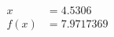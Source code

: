\documentclass[preview]{standalone}
\begin{document}
\begin{align*}
x &= 4.5306\\f(x) &= 7.9717369
\end{align*}
\end{document}

